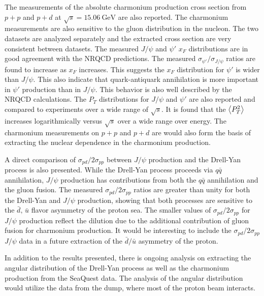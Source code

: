 \documentclass[../main.tex]{subfiles}
\begin{document}
The measurements of the absolute charmonium production cross section from $p+p$
and $p+d$ at $\sqrt{s}=\SI{15.06}{\GeV}$ are also reported. The charmonium measurements
are also sensitive to the gluon distribution in the nucleon. The two datasets
are analyzed separately and the extracted cross section are very consistent between datasets.
The measured $J/\psi$ and $\psi'$ $x_F$ distributions are in good agreement with the NRQCD predictions.
The measured $\sigma_{\psi'}/\sigma_{J/\psi}$ ratios are found to increase as $x_F$ increases.
This suggests the $x_F$ distribution for $\psi'$ is wider than $J/\psi$.
This also indicate that quark-antiquark annihilation is more important in $\psi'$ production than in $J/\psi$.
This behavior is also well described by the NRQCD calculations.
The $P_T$ distributions for $J/\psi$ and $\psi'$ are also reported and compared to experiments over a wide range of $\sqrt{s}$.
It is found that the $\expval{P_T^2}$ increases logarithmically versus $\sqrt{s}$ over a wide range over energy.
The charmonium measurements on $p+p$ and $p+d$ are would also form the basis of
extracting the nuclear dependence in the charmonium production.

A direct comparison of $\sigma_{pd}/2\sigma_{pp}$
between $J/\psi$ production and the Drell-Yan process is also presented. 
While the Drell-Yan process proceeds via $q \bar{q}$ annihilation,
$J/\psi$ production has contributions from both the $q \bar{q}$ annihilation and the gluon fusion.
The measured $\sigma_{pd}/2\sigma_{pp}$ ratios are greater than unity for both the Drell-Yan and $J/\psi$ production,
showing that both processes are sensitive to the $\bar{d},\,\bar{u}$ flavor asymmetry of the proton sea.
The smaller values of $\sigma_{pd}/2\sigma_{pp}$ for $J/\psi$
production reflect the dilution due to the additional contribution
of gluon fusion for charmonium production. 
It would be interesting to include the $\sigma_{pd}/2\sigma_{pp}$ $J/\psi$ data in a future
extraction of the $\bar{d}/ \bar{u}$ asymmetry of the proton. 

In addition to the results presented, there is ongoing analysis on extracting
the angular distribution of the Drell-Yan process as well as the charmonium
production from the SeaQuest data. The analysis of the angular distribution would
utilize the data from the dump, where most of the proton beam interacts.
\end{document}
